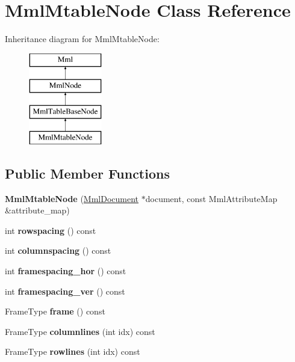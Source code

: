 \hypertarget{class_mml_mtable_node}{}\section{Mml\+Mtable\+Node Class Reference}
\label{class_mml_mtable_node}
Inheritance diagram for Mml\+Mtable\+Node\+:\begin{figure}[H]
\begin{center}
\leavevmode
\includegraphics[height=4.000000cm]{class_mml_mtable_node}
\end{center}
\end{figure}
\subsection*{Public Member Functions}
\begin{DoxyCompactItemize}
\item 
\mbox{\label{class_mml_mtable_node_ae946a9b4e3f4e60fbce3336147a91de3}} 
{\bfseries Mml\+Mtable\+Node} (\mbox{\hyperlink{class_mml_document}{Mml\+Document}} $\ast$document, const Mml\+Attribute\+Map \&attribute\+\_\+map)
\item 
\mbox{\label{class_mml_mtable_node_a60c4d659c7f66e1754e904d1464d54c1}} 
int {\bfseries rowspacing} () const
\item 
\mbox{\label{class_mml_mtable_node_acb05b52835f31507f71ce5c321eaee4c}} 
int {\bfseries columnspacing} () const
\item 
\mbox{\label{class_mml_mtable_node_a4dddbbe4f7ffaf959e8ef97f43f9fd44}} 
int {\bfseries framespacing\+\_\+hor} () const
\item 
\mbox{\label{class_mml_mtable_node_ac45811ce14bd8d5f6663cfd4aacd5b11}} 
int {\bfseries framespacing\+\_\+ver} () const
\item 
\mbox{\label{class_mml_mtable_node_a8481270f67bc01730d25d54dd3e141a6}} 
Frame\+Type {\bfseries frame} () const
\item 
\mbox{\label{class_mml_mtable_node_a809690e754c29f200164b174d3d5d89a}} 
Frame\+Type {\bfseries columnlines} (int idx) const
\item 
\mbox{\label{class_mml_mtable_node_a49ca44be9000216111a4c71ac0b5ee08}} 
Frame\+Type {\bfseries rowlines} (int idx) const
\end{DoxyCompactItemize}

